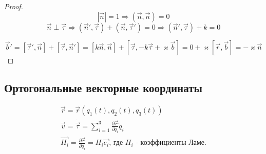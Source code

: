 \documentclass{article}
\renewcommand{\v}[1]{{\vec{#1}}}
\begin{document}
  \begin{proof}
  $$ | \v{n} | = 1 \Rightarrow (\v{n}, \v{n}) = 0 $$
  $$ \v{n} \perp \v{\tau} \Rightarrow (\v{n}', \v{\tau}) + (\v{n}, \v{\tau}') = 0 \Rightarrow (\v{n}', \v{\tau}) + k = 0 $$
  
  $$ \v{b}' = [\v{ \tau}', \v{n}] + [\v{\tau}, \v{n}'] = [k\v{n}, \v{n}] + [\v{\tau}, -k\v{\tau} + \varkappa \v{b}] = 0 + \varkappa[\v{r}, \v{b}] = -\varkappa\v{n} $$
  \end{proof}
  \subsection{Ортогональные векторные координаты}
  
  \begin{gather}
  \v{r} = \v{r}(q_1(t), q_2(t), q_3(t)) \\
  \v{v} = \dot{\vec {\tau}}= \sum \limits_{i = 1}^3 \frac{\partial\v{r}}{\partial q_i} \dot q_i\\
  \v{H_i} = \frac{\partial\v{r}}{\partial q_i} = H_i \v{e_i} \text{, где $H_i$ - коэффициенты Ламе.} \\ 
  \end{gather}
\end{document}
